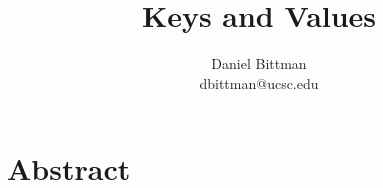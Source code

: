 \documentclass[twocolumn,10pt]{article}
\author{Daniel Bittman \\ dbittman@ucsc.edu}
\title{Keys and Values}
\begin{document}
\biolinum
\maketitle
\libertine 
\renewcommand\ttdefault{lmtt}



\section*{Abstract}





















\end{document}
